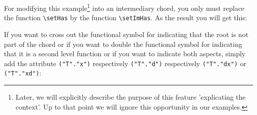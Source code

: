 \documentclass[
  DIV=calc,
  BCOR=5mm,
  12pt,
  headings=small,
  oneside,
  abstract=true,
  toc=bib,
  xcolor=dvipsnames,
  openany,
  ngerman,english]{scrartcl}
\begin{document}
\begin{center}
\end{center}

For modifying this example\footnote{Later, we will explicitly describe the
purpose of this feature 'explicating the context'. Up to that point we will
ignore this opportunity in our examples.} into an intermediary chord, you only
must replace the function \texttt{\textbackslash setHas} by the function
\texttt{\textbackslash setImHas}. As the result you will get this:

\begin{center}
\end{center}

If you want to cross out the functional symbol for indicating that the root is
not part of the chord or if you want to double the functional symbol for
indicating that it is a second level function or if you want to indicate both
aspects, simply add the attribute \verb|("T"."x")| respectively
\verb|("T"."d")| respectively \verb|("T"."dx")| or \verb|("T"."xd")|:
\end{document}
